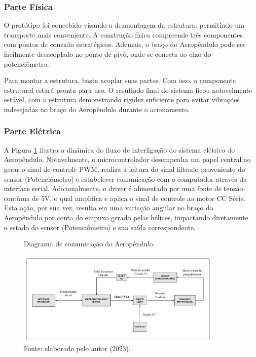\subsubsection{Parte Física}

O protótipo foi concebido visando a desmontagem da estrutura, permitindo um transporte mais conveniente. A construção física compreende três componentes com pontos de conexão estratégicos. Ademais, o braço do Aeropêndulo pode ser facilmente desacoplado no ponto de pivô, onde se conecta ao eixo do potenciômetro.

Para montar a estrutura, basta acoplar suas partes. Com isso, a componente estrutural estará pronta para uso. O resultado final do sistema ficou notavelmente estável, com a estrutura demonstrando rigidez suficiente para evitar vibrações indesejadas no braço do Aeropêndulo durante o acionamento.

\subsubsection{Parte Elétrica}


A Figura \ref{fig3:image_11} ilustra a dinâmica do fluxo de interligação do sistema elétrico do Aeropêndulo. Notavelmente, o microcontrolador desempenha um papel central ao gerar o sinal de controle PWM, realiza a leitura do sinal filtrado proveniente do sensor (Potenciômetro) e estabelecer comunicação com o computador através da interface serial. Adicionalmente, o driver é alimentado por uma fonte de tensão contínua de 5V, o qual amplifica e aplica o sinal de controle ao motor CC Série. Esta ação, por sua vez, resulta em uma variação angular no braço do Aeropêndulo por conta do empuxo gerado pelas hélices, impactando diretamente o estado do sensor (Potenciômetro) e sua saída correspondente.

\begin{figure}[!h]
	\centering
	\caption{Diagrama de comunicação do Aeropêndulo.}
	\includegraphics[width=0.9\textwidth, page=1]{Capitulos/3_hardware_softwares/3_figuras/diag_aerop.pdf}
	\caption*{Fonte: elaborado pelo autor (2023).}
	\label{fig3:image_11}
\end{figure}



